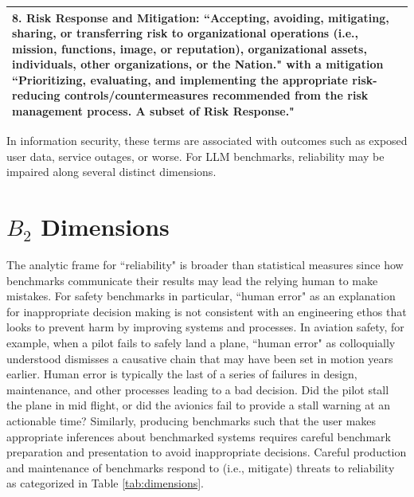 \documentclass{article}
\newcommand\bb{$B_2$ }
\begin{document}
\begin{table}[h!]
\begin{tabular}{p{12cm}}
    \midrule
    \textbf{8. Risk Response and Mitigation:} ``Accepting, avoiding, mitigating, sharing, or transferring risk to organizational operations (i.e., mission, functions, image, or reputation), organizational assets, individuals, other organizations, or the Nation." \cite{joint2011sp} with a mitigation ``Prioritizing, evaluating, and implementing the appropriate risk-reducing controls/countermeasures recommended from the risk management process. A subset of Risk Response." \cite{cnssi4009} \\
    \bottomrule
  \end{tabular}
\end{table}

In information security, these terms are associated with outcomes such as exposed user data, service outages, or worse. For LLM benchmarks, reliability may be impaired along several distinct dimensions.
\section{\texorpdfstring{\bb}{B2} Dimensions}
The analytic frame for ``reliability" is broader than statistical measures since how benchmarks communicate their results may lead the relying human to make mistakes. For safety benchmarks in particular, ``human error" as an explanation for inappropriate decision making is not consistent with an engineering ethos that looks to prevent harm by improving systems and processes. In aviation safety, for example, when a pilot fails to safely land a plane, ``human error" as colloquially understood dismisses a causative chain that may have been set in motion years earlier. Human error is typically the last of a series of failures in design, maintenance, and other processes leading to a bad decision. Did the pilot stall the plane in mid flight, or did the avionics fail to provide a stall warning at an actionable time? Similarly, producing benchmarks such that the user makes appropriate inferences about benchmarked systems requires careful benchmark preparation and presentation to avoid inappropriate decisions. Careful production and maintenance of benchmarks respond to (i.e., mitigate) threats to reliability as categorized in Table \ref{tab:dimensions}.
\end{document}
